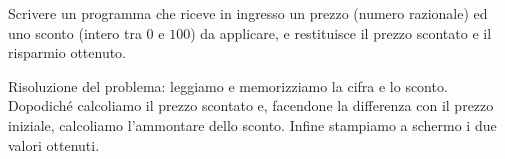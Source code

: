 \begin{Exercise}[label={ex:sconto}]
  Scrivere un programma che riceve in ingresso un prezzo (numero razionale) ed uno sconto (intero tra $0$ e $100$) da applicare, e restituisce il prezzo scontato e il risparmio ottenuto.
\end{Exercise}

\begin{Answer}[ref={ex:sconto}]
	Risoluzione del problema: leggiamo e memorizziamo la cifra e lo sconto. Dopodich\'e calcoliamo il prezzo scontato e, facendone la differenza con il prezzo iniziale, calcoliamo l'ammontare dello sconto. Infine stampiamo a schermo i due valori ottenuti.
	
  
\end{Answer}
